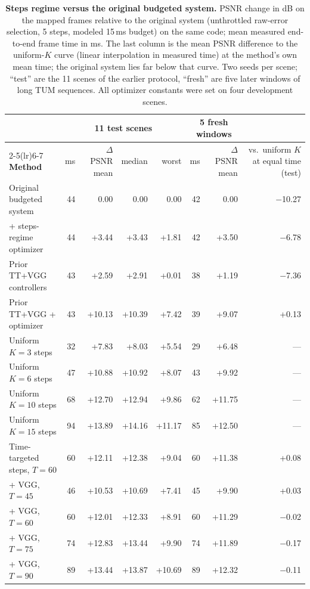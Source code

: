 \begin{table}[t]
\centering
\footnotesize\setlength{\tabcolsep}{4pt}
\begin{tabular}{lrrrrrrr}
\toprule
& \multicolumn{4}{c}{11 test scenes} & \multicolumn{2}{c}{5 fresh windows} & \\
\cmidrule(lr){2-5}\cmidrule(lr){6-7}
\textbf{Method} & ms & $\Delta$PSNR mean & median & worst & ms & $\Delta$PSNR mean & vs.\ uniform $K$ at equal time (test) \\
\midrule
Original budgeted system & 44 & 0.00 & 0.00 & 0.00 & 42 & 0.00 & $-$10.27 \\
+ steps-regime optimizer & 44 & +3.44 & +3.43 & +1.81 & 42 & +3.50 & $-$6.78 \\
\midrule
Prior TT+VGG controllers & 43 & +2.59 & +2.91 & +0.01 & 38 & +1.19 & $-$7.36 \\
Prior TT+VGG + optimizer & 43 & +10.13 & +10.39 & +7.42 & 39 & +9.07 & +0.13 \\
\midrule
Uniform $K{=}3$ steps & 32 & +7.83 & +8.03 & +5.54 & 29 & +6.48 & --- \\
Uniform $K{=}6$ steps & 47 & +10.88 & +10.92 & +8.07 & 43 & +9.92 & --- \\
Uniform $K{=}10$ steps & 68 & +12.70 & +12.94 & +9.86 & 62 & +11.75 & --- \\
Uniform $K{=}15$ steps & 94 & +13.89 & +14.16 & +11.17 & 85 & +12.50 & --- \\
\midrule
Time-targeted steps, $T{=}60$ & 60 & +12.11 & +12.38 & +9.04 & 60 & +11.38 & +0.08 \\
\quad + VGG, $T{=}45$ & 46 & +10.53 & +10.69 & +7.41 & 45 & +9.90 & +0.03 \\
\quad + VGG, $T{=}60$ & 60 & +12.01 & +12.33 & +8.91 & 60 & +11.29 & $-$0.02 \\
\quad + VGG, $T{=}75$ & 74 & +12.83 & +13.44 & +9.90 & 74 & +11.89 & $-$0.17 \\
\quad + VGG, $T{=}90$ & 89 & +13.44 & +13.87 & +10.69 & 89 & +12.32 & $-$0.11 \\
\bottomrule
\end{tabular}
\caption{\textbf{Steps regime versus the original budgeted system.} PSNR change in dB on the mapped frames relative to the original system (unthrottled raw-error selection, 5 steps, modeled 15\,ms budget) on the same code; mean measured end-to-end frame time in ms. The last column is the mean PSNR difference to the uniform-$K$ curve (linear interpolation in measured time) at the method's own mean time; the original system lies far below that curve. Two seeds per scene; ``test'' are the 11 scenes of the earlier protocol, ``fresh'' are five later windows of long TUM sequences. All optimizer constants were set on four development scenes.}
\label{tab:engine}
\end{table}
